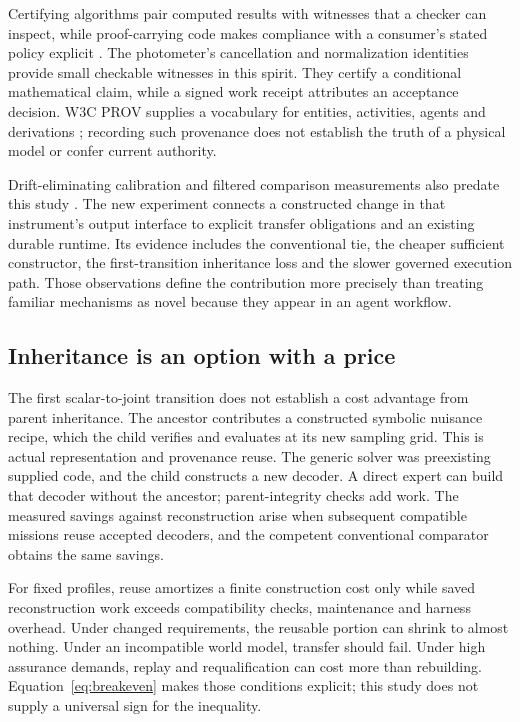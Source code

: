 \documentclass[11pt]{article}
\begin{document}
Certifying algorithms pair computed results with witnesses that a checker can inspect, while proof-carrying code makes compliance with a consumer's stated policy explicit \cite{mcconnell_certifying2011,pcc}. The photometer's cancellation and normalization identities provide small checkable witnesses in this spirit. They certify a conditional mathematical claim, while a signed work receipt attributes an acceptance decision. W3C PROV supplies a vocabulary for entities, activities, agents and derivations \cite{prov}; recording such provenance does not establish the truth of a physical model or confer current authority.

Drift-eliminating calibration and filtered comparison measurements also predate this study \cite{doiron,swanson}. The new experiment connects a constructed change in that instrument's output interface to explicit transfer obligations and an existing durable runtime. Its evidence includes the conventional tie, the cheaper sufficient constructor, the first-transition inheritance loss and the slower governed execution path. Those observations define the contribution more precisely than treating familiar mechanisms as novel because they appear in an agent workflow.

\subsection{Inheritance is an option with a price}

The first scalar-to-joint transition does not establish a cost advantage from parent inheritance. The ancestor contributes a constructed symbolic nuisance recipe, which the child verifies and evaluates at its new sampling grid. This is actual representation and provenance reuse. The generic solver was preexisting supplied code, and the child constructs a new decoder. A direct expert can build that decoder without the ancestor; parent-integrity checks add work. The measured savings against reconstruction arise when subsequent compatible missions reuse accepted decoders, and the competent conventional comparator obtains the same savings.

For fixed profiles, reuse amortizes a finite construction cost only while saved reconstruction work exceeds compatibility checks, maintenance and harness overhead. Under changed requirements, the reusable portion can shrink to almost nothing. Under an incompatible world model, transfer should fail. Under high assurance demands, replay and requalification can cost more than rebuilding. Equation~\eqref{eq:breakeven} makes those conditions explicit; this study does not supply a universal sign for the inequality.
\end{document}
